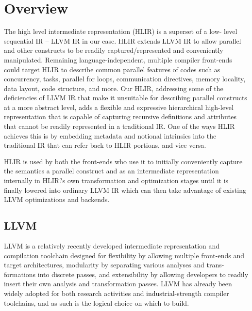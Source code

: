 \documentclass[12pt]{article}
\begin{document}
\maketitle

\section{Overview}

The high level intermediate representation (HLIR) is a superset of a low- level sequential IR -- LLVM IR in our case. HLIR extends LLVM IR to allow parallel and other constructs to be readily captured/represented and conveniently manipulated. Remaining language-independent, multiple compiler front-ends could target HLIR to describe common parallel features of codes such as concurrency, tasks, parallel for loops, communication directives, memory locality, data layout, code structure, and more. Our HLIR, addressing some of the deficiencies of LLVM IR that make it unsuitable for describing parallel constructs at a more abstract level, adds a flexible and expressive hierarchical high-level representation that is capable of capturing recursive definitions and attributes that cannot be readily represented in a traditional IR. One of the ways HLIR achieves this is by embedding metadata and notional intrinsics into the traditional IR that can refer back to HLIR portions, and vice versa.

HLIR is used by both the front-ends who use it to initially conveniently capture the semantics a parallel construct and as an intermediate representation internally in HLIR?s own transformation and optimization stages until it is finally lowered into ordinary LLVM IR which can then take advantage of existing LLVM optimizations and backends.

\subsection{LLVM}

LLVM is a relatively recently developed intermediate representation and compilation toolchain designed for flexibility by allowing multiple front-ends and target architectures, modularity by separating various analyses and trans- formations into discrete passes, and extensibility by allowing developers to readily insert their own analysis and transformation passes. LLVM has already been widely adopted for both research activities and industrial-strength compiler toolchains, and as such is the logical choice on which to build.
\end{document}
